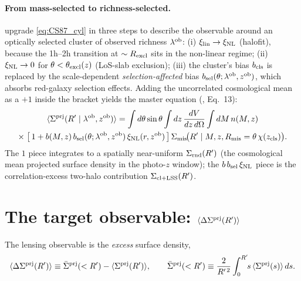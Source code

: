 \documentclass[a4paper, 11pt]{article}
\newcommand{\lob}{\lambda^{\rm ob}}
\newcommand{\zob}{z^{\rm ob}}
\newcommand{\zcls}{z_{\rm cls}}
\newcommand{\xinl}{\xi_{\rm NL}}
\newcommand{\xilin}{\xi_{\rm lin}}
\newcommand{\bsel}{b_{\rm sel}}
\newcommand{\bcls}{b_{\rm cls}}
\newcommand{\Sprj}{\Sigma^{\rm prj}}
\newcommand{\Smis}{\Sigma_{\rm mis}}
\newcommand{\DSprj}{\Delta\Sigma^{\rm prj}}
\newcommand{\avg}[1]{\langle #1 \rangle}
\newcommand{\Rmis}{R_{\rm mis}}
\newcommand{\Rexcl}{R_{\rm excl}}
\newcommand{\texcl}{\theta_{\rm excl}}
\newcommand{\dO}{d\Omega}
\begin{document}
\paragraph{From mass-selected to richness-selected.}
\citet{Costanzi2026} upgrade \eqref{eq:CS87_cyl} in three steps to
describe the observable around an optically selected cluster of
observed richness \(\lob\):
(i) \(\xilin\to\xinl\) (halofit), because the 1h--2h transition at
\(\sim\Rexcl\) sits in the non-linear regime;
(ii) \(\xinl\to 0\) for \(\theta<\texcl(z)\) (LoS-slab exclusion);
(iii) the cluster's bias \(\bcls\) is replaced by the
scale-dependent \emph{selection-affected} bias
\(\bsel(\theta;\lob,\zob)\), which absorbs red-galaxy selection
effects. Adding the uncorrelated cosmological mean as a \(+1\)
inside the bracket yields the master equation
(\citealt{Costanzi2026}, Eq.~13):
\begin{multline}
\avg{\Sprj(R'\mid\lob,\zob)} =
\int d\theta\sin\theta\int dz\,\frac{dV}{dz\,\dO}\int dM\,n(M,z)\\
\times\;\bigl[\,1 + b(M,z)\,\bsel(\theta;\lob,\zob)\,\xinl(r,\zob)\,\bigr]\,
\Smis\!\bigl(R'\mid M,z,\Rmis=\theta\,\chi(\zcls)\bigr).
\label{eq:Sprj}
\end{multline}
The \(1\) piece integrates to a spatially near-uniform
\(\Sigma_{\rm rnd}(R')\) (the cosmological mean projected surface
density in the photo-\(z\) window); the \(b\,\bsel\,\xinl\) piece
is the correlation-excess two-halo contribution
\(\Sigma_{\rm cl+LSS}(R')\).

\section{\texorpdfstring{The target observable: \(\avg{\DSprj(R')}\)}{The target observable: DeltaSigma prj}}
\label{sec:dsprj}

The lensing observable is the \emph{excess} surface density,
\begin{equation}
\avg{\DSprj(R')} \equiv \bar\Sigma^{\rm prj}(<R') - \avg{\Sprj(R')},
\qquad
\bar\Sigma^{\rm prj}(<R') \equiv \frac{2}{R'^{\,2}}\int_0^{R'}\!\!
s\,\avg{\Sprj(s)}\,ds .
\label{eq:DSprj_def}
\end{equation}
\end{document}
